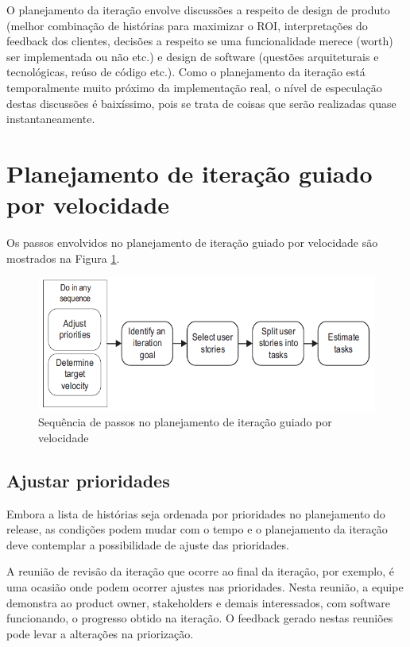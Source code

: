 \documentclass[a4paper,abntfigtabnum,noindentfirst]{abnt}
\begin{document}
O planejamento da iteração envolve discussões a respeito de design de produto (melhor combinação de histórias para maximizar o ROI, interpretações do feedback dos clientes, decisões a respeito se uma funcionalidade merece (worth) ser implementada ou não etc.) e design de software (questões arquiteturais e tecnológicas, reúso de código etc.).  Como o planejamento da iteração está temporalmente muito próximo da implementação real, o nível de especulação destas discussões é baixíssimo, pois se trata de coisas que serão realizadas quase instantaneamente.

\section{Planejamento de iteração guiado por velocidade}

Os passos envolvidos no planejamento de iteração guiado por velocidade são mostrados na Figura \ref{planejamento-de-iteracao-guiado-por-velocidade}.

\begin{figure}
  \caption{Sequência de passos no planejamento de iteração guiado por velocidade}
  \label{planejamento-de-iteracao-guiado-por-velocidade}
  \begin{center}
  \includegraphics[scale=0.6]{planejamento-de-iteracao-guiado-por-velocidade}
  \end{center}
\end{figure}


\subsection{Ajustar prioridades}

Embora a lista de histórias seja ordenada por prioridades no planejamento do release, as condições podem mudar com o tempo e o planejamento da iteração deve contemplar a possibilidade de ajuste das prioridades.

A reunião de revisão da iteração que ocorre ao final da iteração, por exemplo, é uma ocasião onde podem ocorrer ajustes nas prioridades. Nesta reunião, a equipe demonstra ao product owner, stakeholders e demais interessados, com software funcionando, o progresso obtido na iteração. O feedback gerado nestas reuniões pode levar a alterações na priorização.
\end{document}

